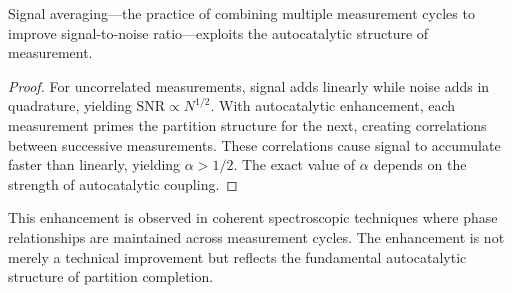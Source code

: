 Signal averaging—the practice of combining multiple measurement cycles to improve signal-to-noise ratio—exploits the autocatalytic structure of measurement.


\begin{proof}
For uncorrelated measurements, signal adds linearly while noise adds in quadrature, yielding $\mathrm{SNR} \propto N^{1/2}$. With autocatalytic enhancement, each measurement primes the partition structure for the next, creating correlations between successive measurements. These correlations cause signal to accumulate faster than linearly, yielding $\alpha > 1/2$. The exact value of $\alpha$ depends on the strength of autocatalytic coupling.
\end{proof}

This enhancement is observed in coherent spectroscopic techniques where phase relationships are maintained across measurement cycles. The enhancement is not merely a technical improvement but reflects the fundamental autocatalytic structure of partition completion.

